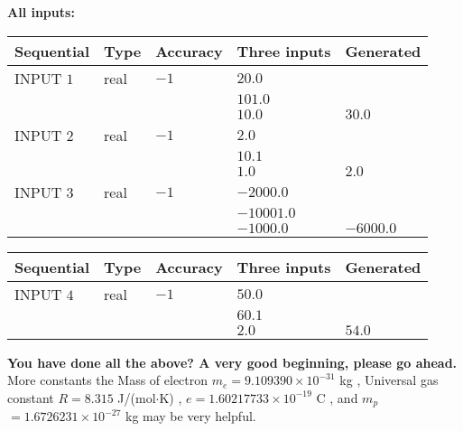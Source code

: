 \documentclass[12pt]{article}
\begin{document}
   
   
   
\noindent\vspace{0.1in}\hspace{-0.08in} {\textbf{\Large{All inputs: }}}
   
   
  
  
\noindent\begin{tabular}{|l|l|l|l|l|}
\hline
 Sequential & Type & Accuracy & Three inputs & Generated \\ 
\hline
 
 
  INPUT $            1 $ & real & $           -1  $ & $
 20.0
  $ & \\
  & & &  $
 101.0
  $ & \\
  & & &  $
 10.0
 $ & $ 30.0 $ 
 \\  \hline  
 
 
  INPUT $            2 $ & real & $           -1  $ & $
 2.0
  $ & \\
  & & &  $
 10.1
  $ & \\
  & & &  $
 1.0
 $ & $ 2.0 $ 
 \\  \hline  
 
 
  INPUT $            3 $ & real & $           -1  $ & $
 -2000.0
  $ & \\
  & & &  $
 -10001.0
  $ & \\
  & & &  $
 -1000.0
 $ & $ -6000.0 $ 
 \\  \hline  
 \end{tabular}
   
   
  
  
\noindent\begin{tabular}{|l|l|l|l|l|}
\hline
 Sequential & Type & Accuracy & Three inputs & Generated \\ 
\hline
 
 
  INPUT $            4 $ & real & $           -1  $ & $
 50.0
  $ & \\
  & & &  $
 60.1
  $ & \\
  & & &  $
 2.0
 $ & $ 54.0 $ 
 \\  \hline  
 \end{tabular}
   
   
   
   
\vspace{0.3in}
{\textbf{\LARGE{You have done all the above? A very good beginning, please go ahead.}}}
More constants the
Mass of electron
$m_e$$ =
9.109390 \times 10^{-31} $
kg
,
Universal gas constant
$R$$ =
8.315 $
J/(mol$\cdot $K)
,
$e$$ =
1.60217733 \times 10^{-19} $
C
, and
$m_p$$ =
1.6726231 \times 10^{-27} $
kg
%
may be very helpful.
\vspace{0.3in}
   
\end{document}

